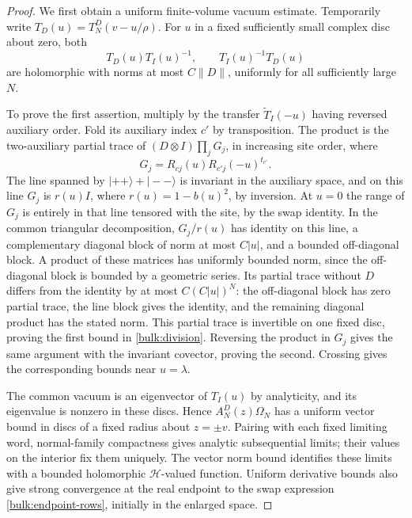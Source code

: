 \begin{proof}
We first obtain a uniform finite-volume vacuum estimate. Temporarily
write $T_D(u)=T_N^D(v-u/\rho)$. For $u$ in a fixed sufficiently
small complex disc about zero, both
\begin{equation}\label{bulk:division}
 T_D(u)T_I(u)^{-1},\qquad T_I(u)^{-1}T_D(u)
\end{equation}
are holomorphic with norms at most $C\|D\|$, uniformly for all
sufficiently large $N$.

To prove the first assertion, multiply by the transfer
$\widetilde T_I(-u)$ having reversed auxiliary order. Fold its
auxiliary index $c'$ by transposition. The product is the
two-auxiliary partial trace of
$(D\otimes I)\prod_jG_j$, in increasing site order, where
\[
 G_j=R_{cj}(u)R_{c'j}(-u)^{t_{c'}}.
\]
The line spanned by $|++\rangle+|--\rangle$ is invariant in the
auxiliary space, and on this line $G_j$ is
$r(u)I$, where $r(u)=1-b(u)^2$, by inversion. At $u=0$ the range
of $G_j$ is entirely in that line tensored with the site, by the
swap identity. In the common triangular decomposition, $G_j/r(u)$
has identity on this line, a complementary diagonal block of
norm at most $C|u|$, and a bounded off-diagonal block. A product of
these matrices has uniformly bounded norm, since the
off-diagonal block is bounded by a geometric series. Its partial
trace without $D$ differs from the identity by at most
$C(C|u|)^N$: the off-diagonal block has zero partial trace, the
line block gives the identity, and the remaining diagonal product
has the stated norm. This partial trace is invertible on one
fixed disc, proving the first bound in \eqref{bulk:division}.
Reversing the product in $G_j$ gives the same argument with the
invariant covector, proving the second. Crossing gives the
corresponding bounds near $u=\lambda$.

The common vacuum is an eigenvector of $T_I(u)$ by analyticity,
and its eigenvalue is nonzero in these discs. Hence
$A_N^D(z)\Omega_N$ has a uniform vector bound in discs of a fixed
radius about $z=\pm v$. Pairing with each fixed limiting word,
normal-family compactness gives analytic subsequential limits;
their values on the interior fix them uniquely. The vector norm
bound identifies these limits with a bounded holomorphic
$\mathcal H$-valued function. Uniform derivative bounds also give
strong convergence at the real endpoint to the swap expression
\eqref{bulk:endpoint-rows}, initially in the enlarged space.


\end{proof}
